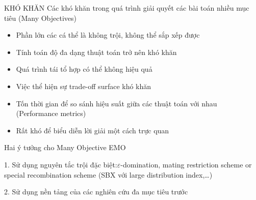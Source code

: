 \documentclass{beamer}
\begin{document}
\begin{frame}{KHÓ KHĂN}
{Các khó khăn trong quá trình giải quyết các bài toán nhiều mục tiêu (Many Objectives)}
    \begin{itemize}
        \item <1-> Phần lớn các cá thể là không trội, không thể sắp xếp được
        \item <2-> Tính toán độ đa dạng thuật toán trở nên khó khăn
        \item <3-> Quá trình tái tổ hợp có thể không hiệu quả
        \item <4-> Việc thể hiện sự trade-off surface khó khăn
        \item <5-> Tốn thời gian để so sánh hiệu suất giữa các thuật toán với nhau (Performance metrics)
        \item <6-> Rất khó để biểu diễn lời giải một cách trực quan
    \end{itemize}
\end{frame}
\begin{frame}{Hai ý tưởng cho Many Objective EMO}
    \begin{block}{1.}
        Sử dụng nguyên tắc trội đặc biệt:$\varepsilon$-domination, mating restriction scheme or special recombination scheme (SBX với large distribution index,…)
    \end{block}
    \pause
    \begin{block}{2.}
        Sử dụng nền tảng của các nghiên cứu đa mục tiêu trước
    \end{block}
\end{frame}
\end{document}
